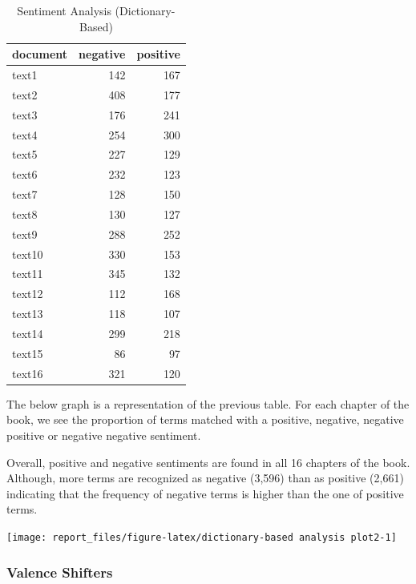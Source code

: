 \documentclass[
]{article}
\begin{document}
\begin{table}

\caption{\label{tab:dictionary-based analysis}Sentiment Analysis (Dictionary-Based)}
\centering
\begin{tabular}[t]{l|r|r}
\hline
document & negative & positive\\
\hline
text1 & 142 & 167\\
\hline
text2 & 408 & 177\\
\hline
text3 & 176 & 241\\
\hline
text4 & 254 & 300\\
\hline
text5 & 227 & 129\\
\hline
text6 & 232 & 123\\
\hline
text7 & 128 & 150\\
\hline
text8 & 130 & 127\\
\hline
text9 & 288 & 252\\
\hline
text10 & 330 & 153\\
\hline
text11 & 345 & 132\\
\hline
text12 & 112 & 168\\
\hline
text13 & 118 & 107\\
\hline
text14 & 299 & 218\\
\hline
text15 & 86 & 97\\
\hline
text16 & 321 & 120\\
\hline
\end{tabular}
\end{table}

The below graph is a representation of the previous table. For each
chapter of the book, we see the proportion of terms matched with a
positive, negative, negative positive or negative negative sentiment.

Overall, positive and negative sentiments are found in all 16 chapters
of the book. Although, more terms are recognized as negative (3,596)
than as positive (2,661) indicating that the frequency of negative terms
is higher than the one of positive terms.

\begin{center}\texttt{[image: report\_files/figure-latex/dictionary-based analysis plot2-1]} \end{center}

\hypertarget{valence-shifters}{%
\subsubsection{Valence Shifters}\label{valence-shifters}}
\end{document}
